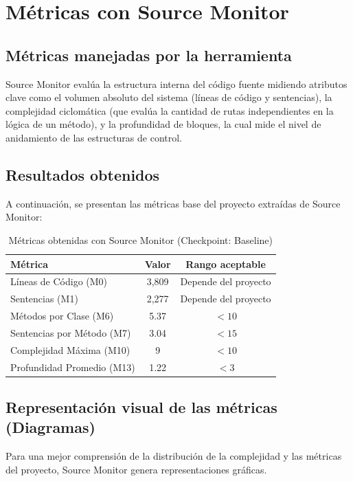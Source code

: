 \documentclass[12pt, a4paper]{article}
\begin{document}
\section{Métricas con Source Monitor}

\subsection{Métricas manejadas por la herramienta}
Source Monitor evalúa la estructura interna del código fuente midiendo atributos clave como el volumen absoluto del sistema (líneas de código y sentencias), la complejidad ciclomática (que evalúa la cantidad de rutas independientes en la lógica de un método), y la profundidad de bloques, la cual mide el nivel de anidamiento de las estructuras de control.

\subsection{Resultados obtenidos}
A continuación, se presentan las métricas base del proyecto extraídas de Source Monitor:

\begin{table}[H]
  \centering
  \begin{tabular}{lcc}
    \toprule
    \textbf{Métrica} & \textbf{Valor} & \textbf{Rango aceptable} \\
    \midrule
    Líneas de Código (M0) & 3,809 & Depende del proyecto \\
    Sentencias (M1) & 2,277 & Depende del proyecto \\
    Métodos por Clase (M6) & 5.37 & $< 10$ \\
    Sentencias por Método (M7) & 3.04 & $< 15$ \\
    Complejidad Máxima (M10) & 9 & $< 10$ \\
    Profundidad Promedio (M13) & 1.22 & $< 3$ \\
    \bottomrule
  \end{tabular}
  \caption{Métricas obtenidas con Source Monitor (Checkpoint: Baseline)}
\end{table}

\subsection{Representación visual de las métricas (Diagramas)}
Para una mejor comprensión de la distribución de la complejidad y las métricas del proyecto, Source Monitor genera representaciones gráficas. 
\end{document}
